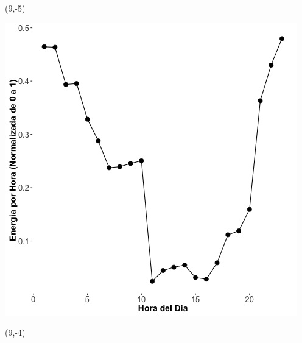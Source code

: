 \documentclass{article}\usepackage[]{graphicx}\usepackage[]{color}
\newenvironment{knitrout}{}{} %
\begin{document}
 \begin{textblock}{1}(9,-5)
\begin{minipage}{20em}
\begingroup

\endgroup
\end{minipage}
\end{textblock}

\begin{knitrout}
\color{fgcolor}
\includegraphics[scale=0.65]{figure/A20_plot_norm_median} 
\end{knitrout}


 \begin{textblock}{1}(9,-4)
\begin{minipage}{20em}
\begingroup

\endgroup
\end{minipage}
\end{textblock}
\end{document}
